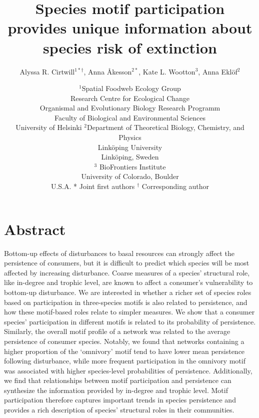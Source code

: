 \documentclass[12pt]{article}
\title{Species motif participation provides unique information about species risk of extinction}
\author{Alyssa R. Cirtwill$^{1*\dagger}$, Anna \r{A}kesson$^{2*}$, Kate L. Wootton$^{3}$, Anna Ekl\"{o}f$^{2}$}
\date{
\small$^1$Spatial Foodweb Ecology Group\\
Research Centre for Ecological Change\\
Organismal and Evolutionary Biology Research Programm\\
Faculty of Biological and Environmental Sciences\\
University of Helsinki
\medskip
\small$^2$Department of Theoretical Biology, Chemistry, and Physics\\ 
Link\"{o}ping University\\
Link\"{o}ping, Sweden\\
\medskip
\small$^3$ BioFrontiers Institute\\
University of Colorado, Boulder\\
U.S.A.
\medskip
* Joint first authors
\medskip
$^\dagger$ Corresponding author\\
}
\begin{document}
 
\maketitle 
\linenumbers
\raggedright

\setlength{\parindent}{15pt} 


\section*{Abstract}


    Bottom-up effects of disturbances to basal resources can strongly affect the persistence of consumers, but it is difficult to predict which species will be most affected by increasing disturbance.
    Coarse measures of a species' structural role, like in-degree and trophic level, are known to affect a consumer's vulnerability to bottom-up disturbance.
    We are interested in whether a richer set of species roles based on participation in three-species motifs is also related to persistence, and how these motif-based roles relate to simpler measures.
    We show that a consumer species' participation in different motifs is related to its probability of persistence. 
    Similarly, the overall motif profile of a network was related to the average persistence of consumer species.
    Notably, we found that networks containing a higher proportion of the `omnivory' motif tend to have lower mean persistence following disturbance, while more frequent participation in the omnivory motif was associated with higher species-level probabilities of persistence.
    Additionally, we find that relationships between motif participation and persistence can synthesize the information provided by in-degree and trophic level.
    Motif participation therefore captures important trends in species persistence and provides a rich description of species' structural roles in their communities.
\end{document}

